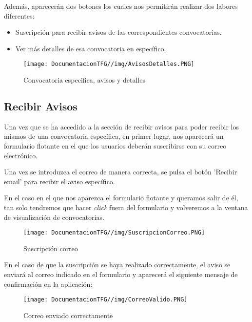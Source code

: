Además, aparecerán dos botones los cuales nos permitirán realizar dos labores diferentes:

\begin{itemize}
    \item Suscripción para recibir avisos de las correspondientes convocatorias.
    \item Ver más detalles de esa convocatoria en específico.
\end{itemize}

\begin{figure}[H]
    \centering
    \texttt{[image: DocumentacionTFG//img/AvisosDetalles.PNG]}
    \caption{Convocatoria especifica, avisos y detalles}
    \label{fig:avisos-detalles}
\end{figure}

\subsection{Recibir Avisos}
Una vez que se ha accedido a la sección de recibir avisos para poder recibir los mismos de una convocatoria específica, en primer lugar, nos aparecerá un formulario flotante en el que los usuarios deberán suscribirse con su correo electrónico.

Una vez se introduzca el correo de manera correcta, se pulsa el botón 'Recibir email' para recibir el aviso específico.

En el caso en el que nos aparezca el formulario flotante y queramos salir de él, tan solo tendremos que hacer \textit{click} fuera del formulario y volveremos a la ventana de visualización de convocatorias.

\begin{figure}[H]
    \centering
    \texttt{[image: DocumentacionTFG//img/SuscripcionCorreo.PNG]}
    \caption{Suscripción correo}
    \label{fig:suscripcion-correo}
\end{figure}

En el caso de que la suscripción se haya realizado correctamente, el aviso se enviará al correo indicado en el formulario y aparecerá el siguiente mensaje de confirmación en la aplicación:

\begin{figure}[H]
    \centering
    \texttt{[image: DocumentacionTFG//img/CorreoValido.PNG]}
    \caption{Correo enviado correctamente}
    \label{fig:correo-enviado}
\end{figure}


